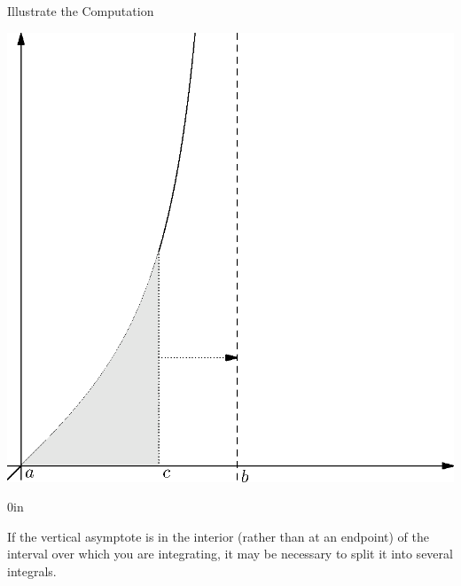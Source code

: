 \begin{exercise}{Illustrate the Computation  \Coffeecup}
{\begin{center}
\includegraphics[scale=0.8]{ChapterGeom/Figures/tanintsolushun.eps}
\end{center}
}{0in}
\end{exercise}

If the vertical asymptote is in the interior (rather than at an endpoint) of the interval over which you are integrating, it may be necessary to split it into several integrals.

